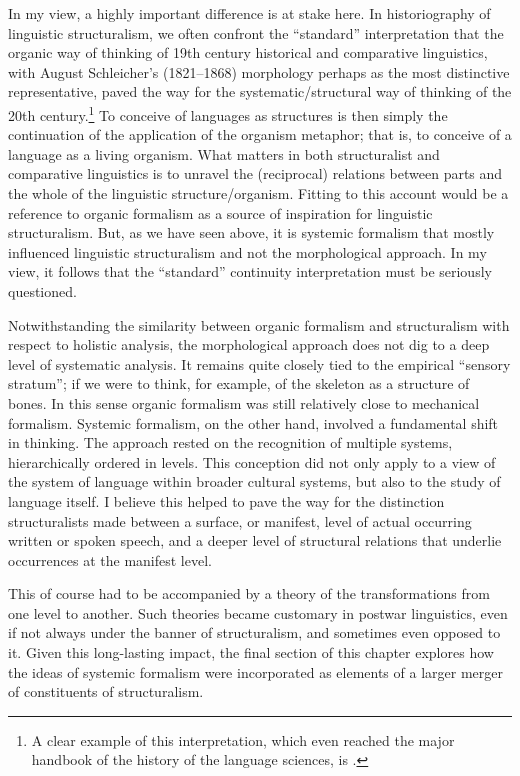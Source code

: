 \documentclass[output=paper]{langscibook}
\begin{document}
In my view, a highly important difference is at stake here. In historiography of linguistic structuralism, we often confront the ``standard'' interpretation that the organic way of thinking of 19th century historical and comparative linguistics, with August Schleicher's (1821--1868) morphology perhaps as the most distinctive representative, paved the way for the systematic/structural way of thinking of the 20th century.\footnote{A clear example of this interpretation, which even reached the major handbook of the history of the language sciences, is \citet{Kohrt2001}.} To conceive of languages as structures is then simply the continuation of the application of the organism metaphor; that is, to conceive of a language as a living organism. What matters in both structuralist and comparative linguistics is to unravel the (reciprocal) relations between parts and the whole of the linguistic structure/organism. Fitting to this account would be a reference to organic formalism as a source of inspiration for linguistic structuralism. But, as we have seen above, it is systemic formalism that mostly influenced linguistic structuralism and not the morphological approach. In my view, it follows that the ``standard'' continuity interpretation must be seriously questioned. 

Notwithstanding the similarity between organic formalism and structuralism with respect to holistic analysis, the morphological approach does not dig to a deep level of systematic analysis. It remains quite closely tied to the empirical ``sensory stratum''; if we were to think, for example, of the skeleton as a structure of bones. In this sense organic formalism was still relatively close to mechanical formalism. Systemic formalism, on the other hand, involved a fundamental shift in thinking. The approach rested on the recognition of multiple systems, hierarchically ordered in levels. This conception did not only apply to a view of the system of language within broader cultural systems, but also to the study of language itself. I believe this helped to pave the way for the distinction structuralists made between a surface, or manifest, level of actual occurring written or spoken speech, and a deeper level of structural relations that underlie occurrences at the manifest level.

This of course had to be accompanied by a theory of the transformations from one level to another. Such theories became customary in postwar linguistics, even if not always under the banner of structuralism, and sometimes even opposed to it. Given this long-lasting impact, the final section of this chapter explores how the ideas of systemic formalism were incorporated as elements of a larger merger of constituents of structuralism.
\end{document}

